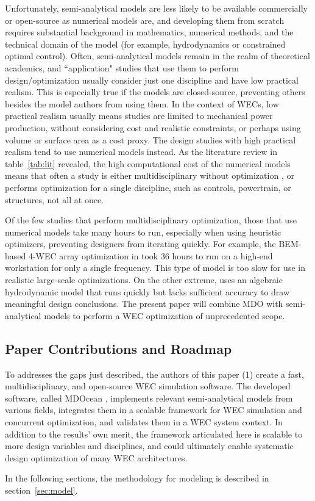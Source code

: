 Unfortunately, semi-analytical models are less likely to be available commercially or open-source as numerical models are, and developing them from scratch requires substantial background in mathematics, numerical methods, and the technical domain of the model (for example, hydrodynamics or constrained optimal control).
Often, semi-analytical models remain in the realm of theoretical academics, and ``application" studies that use them to perform design/optimization usually consider just one discipline and have low practical realism.
This is especially true if the models are closed-source, preventing others besides the model authors from using them.
In the context of WECs, low practical realism usually means studies are limited to mechanical power production, without considering cost and realistic constraints, or perhaps using volume or surface area as a cost proxy.
The design studies with high practical realism tend to use numerical models instead.
As the literature review in table~\ref{tab:lit} revealed, the high computational cost of the numerical models means that often a study is either multidisciplinary without optimization \cite{RM3,mi_multi-scale_2025}, or performs optimization for a single discipline, such as controls, powertrain, or structures, not all at once. 

Of the few studies that perform multidisciplinary optimization, those that use numerical models take many hours to run, especially when using heuristic optimizers, preventing designers from iterating quickly.
For example, the BEM-based 4-WEC array optimization in \cite{khanal_multi-objective_2024} took 36 hours to run on a high-end workstation for only a single frequency.
This type of model is too slow for use in realistic large-scale optimizations.
On the other extreme, \cite{mccabe_multidisciplinary_2022} uses an algebraic hydrodynamic model that runs quickly but lacks sufficient accuracy to draw meaningful design conclusions.
The present paper will combine MDO with semi-analytical models to perform a WEC optimization of unprecedented scope.

\subsection{Paper Contributions and Roadmap}
To addresses the gaps just described, the authors of this paper (1) create a fast, multidisciplinary, and open-source WEC simulation software.
The developed software, called MDOcean \cite{mccabe_mdocean_2024}, implements relevant semi-analytical models from various fields, integrates them in a scalable framework for WEC simulation and concurrent optimization, and validates them in a WEC system context.
In addition to the results' own merit, the framework articulated here is scalable to more design variables and disciplines, and could ultimately enable systematic design optimization of many WEC architectures.

In the following sections, the methodology for modeling is described in section~\ref{sec:model}.
